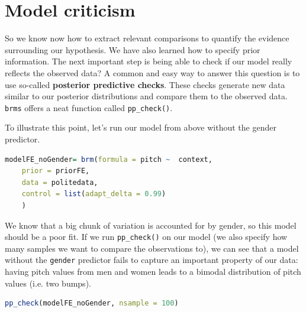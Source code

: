 \documentclass[nobib]{tufte-handout}
\begin{document}
\section{Model criticism}

So we know now how to extract relevant comparisons to quantify the evidence surrounding our hypothesis. We have also learned how to specify prior information. The next important step is being able to check if our model really reflects the observed data? A common and easy way to answer this question is to use so-called \textbf{posterior predictive checks}. These checks generate new data similar to our posterior distributions and compare them to the observed data. \texttt{brms} offers a neat function called \texttt{pp\_check()}. 

To illustrate this point, let's run our model from above without the gender predictor. 

\bigskip

\begin{minipage}[]{1\textwidth}
\begin{lstlisting}[language=R]
modelFE_noGender= brm(formula = pitch ~  context,
	prior = priorFE,
	data = politedata,
	control = list(adapt_delta = 0.99)
	)
\end{lstlisting}
\end{minipage}

We know that a big chunk of variation is accounted for by gender, so this model should be a poor fit. If we run \texttt{pp\_check()} on our model (we also specify how many samples we want to compare the observations to), we can see that a model without the \texttt{gender} predictor fails to capture an important property of our data: having pitch values from men and women leads to a bimodal distribution of pitch values (i.e. two bumps).

\bigskip

\begin{minipage}[]{1\textwidth}
\begin{lstlisting}[language=R]
pp_check(modelFE_noGender, nsample = 100)
\end{lstlisting}
\end{minipage}
\end{document}

